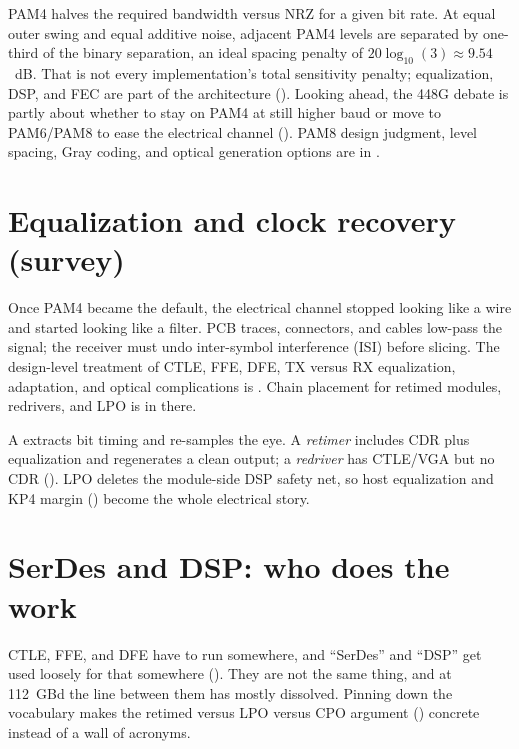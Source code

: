 PAM4 halves the required bandwidth versus NRZ for a given bit rate. At equal
outer swing and equal additive noise, adjacent PAM4 levels are separated by
one-third of the binary separation, an ideal spacing penalty of
$20\log_{10}(3)\approx9.54$~dB. That is not every implementation's total
sensitivity penalty; equalization, DSP, and FEC are part of the architecture
(). Looking ahead, the 448G debate is partly about whether
to stay on PAM4 at still higher baud or move to PAM6/PAM8 to ease the electrical
channel (). PAM8 design judgment, level spacing, Gray coding, and
optical generation options are in .

\section{Equalization and clock recovery (survey)}
\label{sec:imdd-eq-survey}

Once PAM4 became the default, the electrical channel stopped looking like a wire
and started looking like a filter. PCB traces, connectors, and cables low-pass
the signal; the receiver must undo inter-symbol interference (ISI)
before slicing. The design-level treatment of CTLE, FFE, DFE, TX versus RX
equalization, adaptation, and optical complications is
. Chain placement for retimed modules,
redrivers, and LPO is in  there.

A  extracts bit timing and re-samples the eye. A
\emph{retimer} includes CDR plus equalization and regenerates a clean output; a
\emph{redriver} has CTLE/VGA but no CDR (). LPO deletes
the module-side DSP safety net, so host equalization and KP4 margin
() become the whole electrical story.

\section{SerDes and DSP: who does the work}
\label{sec:serdes-dsp}

CTLE, FFE, and DFE have to run somewhere, and ``SerDes'' and ``DSP'' get used
loosely for that somewhere (). They are not the same
thing, and at 112~GBd the line between them has mostly dissolved. Pinning down
the vocabulary makes the retimed versus LPO versus CPO argument
() concrete instead of a wall of acronyms.

